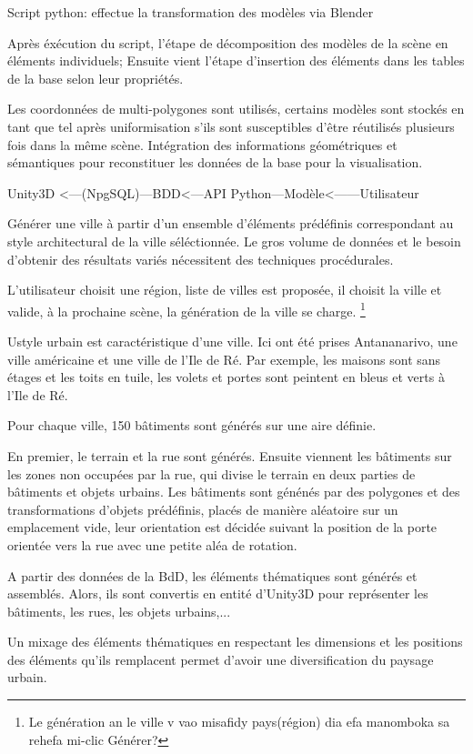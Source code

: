 \documentclass[11pt]{report}
\begin{document}
Script python: effectue la transformation des modèles via Blender

Après éxécution du script, l'étape de décomposition des modèles de la scène en éléments individuels;
Ensuite vient l'étape d'insertion des éléments dans les tables de la base selon leur propriétés. 

Les coordonnées de multi-polygones sont utilisés, certains modèles sont stockés en tant que tel après uniformisation s'ils sont susceptibles d'être réutilisés plusieurs fois dans la même scène. Intégration des informations géométriques et sémantiques pour reconstituer les données de la base pour la visualisation.

Unity3D <---(NpgSQL)---BDD<---API Python---Modèle<------Utilisateur

Générer une ville à partir d'un ensemble d'éléments prédéfinis correspondant au style architectural de la ville séléctionnée. Le gros volume de données et le besoin d'obtenir des résultats variés nécessitent des techniques procédurales.

L'utilisateur choisit une région, liste de villes est proposée, il choisit la ville et valide, à la prochaine scène, la génération de la ville se charge.
\footnote{Le génération an le ville v vao misafidy pays(région) dia efa manomboka sa rehefa mi-clic Générer?}

Ustyle urbain est caractéristique d'une ville. Ici ont été prises Antananarivo, une ville américaine et une ville de l'Ile de Ré. Par exemple, les maisons sont sans étages et les toits en tuile, les volets et portes sont peintent en bleus et verts à l'Ile de Ré.

Pour chaque ville, 150 bâtiments sont générés sur une aire définie.

En premier, le terrain et la rue sont générés. Ensuite viennent les bâtiments sur les zones non occupées par la rue, qui divise le terrain en deux parties de bâtiments et objets urbains.
Les bâtiments sont génénés par des polygones et des transformations d'objets prédéfinis, placés de manière aléatoire sur un emplacement vide, leur orientation  est décidée suivant la position de la porte orientée vers la rue avec une petite aléa de rotation.

A partir des données de la BdD, les éléments thématiques sont générés et assemblés. Alors, ils sont convertis en entité d'Unity3D pour représenter les bâtiments, les rues, les objets urbains,...

Un mixage des éléments thématiques en respectant les dimensions et les positions des éléments qu'ils remplacent permet d'avoir une diversification du paysage urbain.
\end{document}

